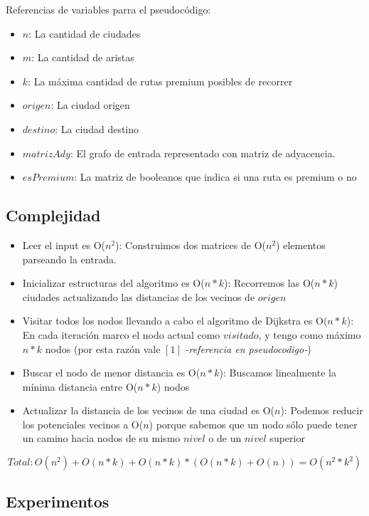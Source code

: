 Referencias de variables parra el pseudocódigo:

\begin{itemize}
	\item $n$: La cantidad de ciudades
	\item $m$: La cantidad de aristas
	\item $k$: La máxima cantidad de rutas premium posibles de recorrer
	\item $origen$: La ciudad origen
	\item $destino$: La ciudad destino
	\item $matrizAdy$: El grafo de entrada representado con matriz de adyacencia.
	\item $esPremium$: La matriz de booleanos que indica si una ruta es premium o no
\end{itemize}

\subsection{Complejidad}

\begin{itemize}
	\item Leer el input es O($n^2$): Construimos dos matrices de O($n^2$) elementos parseando la entrada.
	\item Inicializar estructuras del algoritmo es O($n*k$): Recorremos las O($n*k$) ciudades actualizando las distancias de los vecinos de $origen$
	\item Visitar todos los nodos llevando a cabo el algoritmo de Dijkstra es O($n*k$): En cada iteración marco el nodo actual como $visitado$, y tengo como máximo $n*k$ nodos (por esta razón vale  \label{whilejust}\hyperref[whileback]{$[1]$} \textit{-referencia en pseudocodigo-})
	\item Buscar el nodo de menor distancia es O($n*k$):  Buscamos linealmente la mínima distancia entre O($n*k$) nodos
	\item Actualizar la distancia de los vecinos de una ciudad es O($n$): Podemos reducir los potenciales vecinos a O($n$) porque sabemos que un nodo sólo puede tener un camino hacia nodos de su mismo $nivel$ o de un $nivel$ superior
\end{itemize}

$$Total:  O(n^2) + O(n*k) + O(n*k) * (O(n*k) + O(n)) = O(n^2*k^2) $$

\subsection{Experimentos}

